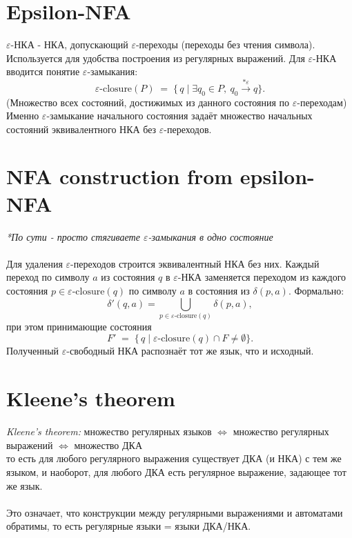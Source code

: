 \documentclass{article}
\begin{document}
	\section{Epsilon-NFA}
	$\varepsilon$-НКА - НКА, допускающий $\varepsilon$-переходы (переходы без чтения символа). Используется для удобства построения из регулярных выражений. Для $\varepsilon$-НКА вводится понятие $\varepsilon$-замыкания: 
	\[
	\varepsilon\text{-closure}(P) \;=\; \{\, q \mid \exists q_0\in P,\ q_0\stackrel{*\varepsilon}{\longrightarrow}q\}.
	\]
	(Множество всех состояний, достижимых из данного состояния по $\varepsilon$-переходам)\\
	Именно $\varepsilon$-замыкание начального состояния задаёт множество начальных состояний эквивалентного НКА без $\varepsilon$-переходов.
	
	\section{NFA construction from epsilon-NFA}
	\textit{*По сути - просто стягиваете $\varepsilon$-замыкания в одно состояние}\\
	\\
	\noindent
	Для удаления $\varepsilon$-переходов строится эквивалентный НКА без них. Каждый переход по символу $a$ из состояния $q$ в $\varepsilon$-НКА заменяется переходом из каждого состояния $p\in\varepsilon\text{-closure}(q)$ по символу $a$ в состояния из $\delta(p,a)$. Формально: 
	\[
	\delta'(q,a) = \bigcup_{p\in\varepsilon\text{-closure}(q)}\delta(p,a),
	\]
	при этом принимающие состояния 
	\[
	F' \;=\; \{\,q \mid \varepsilon\text{-closure}(q)\cap F\neq\emptyset\}.
	\]
	Полученный $\varepsilon$-свободный НКА распознаёт тот же язык, что и исходный.
	
	\section{Kleene’s theorem}

	 \textit{Kleene’s theorem:} множество регулярных языков $\iff$ множество регулярных выражений $\iff$ множество ДКА\\ то есть для любого регулярного выражения существует ДКА (и НКА) с тем же языком, и наоборот, для любого ДКА есть регулярное выражение, задающее тот же язык.\\
	 \\
	 Это означает, что конструкции между регулярными выражениями и автоматами обратимы, то есть регулярные языки = языки ДКА/НКА.
	
\end{document}
